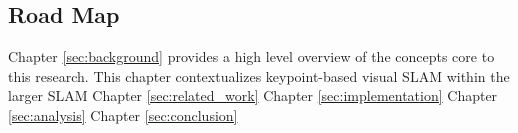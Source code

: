\subsection{Road Map}

Chapter \ref{sec:background} provides a high level overview of the concepts core to this research. This chapter contextualizes keypoint-based visual SLAM within the larger SLAM 
Chapter \ref{sec:related_work}
Chapter \ref{sec:implementation}
Chapter \ref{sec:analysis}
Chapter \ref{sec:conclusion}